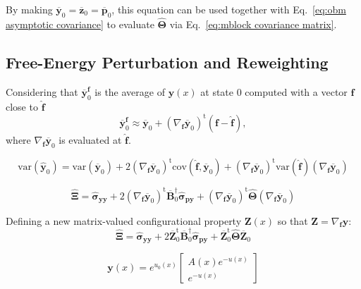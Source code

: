 \documentclass[aip,jcp,reprint,amsmath,amssymb]{revtex4-1}
\newcommand{\mt}[1]{\boldsymbol{\mathbf{#1}}}           %
\newcommand{\vt}[1]{\boldsymbol{\mathbf{#1}}}           %
\newcommand{\tr}[1]{#1^\text{t}}                        %
\begin{document}
By making $\overline{\vt y}_0 = \overline{\vt z}_0 = \overline{\vt p}_0$, this equation can be used together with Eq.~\eqref{eq:obm asymptotic covariance} to evaluate $\hat{\mt \Theta}$ via Eq.~\eqref{eq:mblock covariance matrix}.

\subsection{Free-Energy Perturbation and Reweighting}

Considering that $\overline{\vt y}^{\vt f}_0$ is the average of $\vt y(x)$ at state $0$ computed with a vector $\vt f$ close to $\hat{\vt f}$
\begin{equation*}
\overline{\vt y}^{\vt f}_0 \approx \overline{\vt y}_0 + \tr{(\nabla_{\vt f}\overline{\vt y}_0)}({\vt f} - \hat{\vt f}),
\end{equation*}
where $\nabla_{\vt f}\overline{\vt y}_0$ is evaluated at $\hat{\vt f}$.

\begin{equation}
\text{var}(\hat{\vt y}_0) = \text{var}(\overline{\vt y}_0) + 2\tr{(\nabla_{\vt f}\overline{\vt y}_0)}\text{cov}(\hat{\vt f},\overline{\vt y}_0) + \tr{(\nabla_{\vt f}\overline{\vt y}_0)}\text{var}(\hat{\vt f})(\nabla_{\vt f}\overline{\vt y}_0)
\end{equation}


\begin{equation}
\hat{\mt \Xi} = \hat{\mt \sigma}_{\vt y\vt y} + 2\tr{(\nabla_{\vt f}\overline{\vt y}_0)} \overline{\mt B}_0^\dag \hat{\mt \sigma}_{\vt p\vt y} + \tr{(\nabla_{\vt f}\overline{\vt y}_0)}\hat{\mt \Theta}{(\nabla_{\vt f}\overline{\vt y}_0)}
\end{equation}

Defining a new matrix-valued configurational property $\mt Z(x)$ so that $\mt Z = \nabla_{\vt f}\vt y$:
\begin{equation}
\hat{\mt \Xi} = \hat{\mt \sigma}_{\vt y\vt y} + 2\tr{\overline{\mt Z}_0} \overline{\mt B}_0^\dag \hat{\mt \sigma}_{\vt p\vt y} + \tr{\overline{\mt Z}_0}\hat{\mt \Theta}{\overline{\mt Z}_0}
\end{equation}

\begin{equation}
{\vt y}(x) = e^{u_0(x)} \left[\begin{array}{c} A(x)e^{-u(x)} \\ e^{-u(x)} \end{array}\right]
\end{equation}
\end{document}
